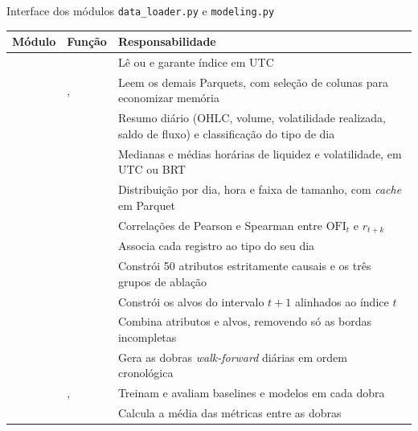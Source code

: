 \begin{quadro}[htbp]
\caption{\label{qua:modulos2}Interface dos módulos \texttt{data\_loader.py} e \texttt{modeling.py}}
\begin{corpotabela}
\begin{tabularx}{\textwidth}{|L{1.9cm}|L{4.6cm}|Y|}
\hline
\textbf{Módulo} & \textbf{Função} & \textbf{Responsabilidade} \\ \hline
{}
 &  & Lê  ou  e garante índice em UTC \\ 
 & ,  & Leem os demais Parquets, com seleção de colunas para economizar memória \\ 
 &  & Resumo diário (OHLC, volume, volatilidade realizada, saldo de fluxo) e classificação do tipo de dia \\ 
 &  & Medianas e médias horárias de liquidez e volatilidade, em UTC ou BRT \\ 
 &  & Distribuição por dia, hora e faixa de tamanho, com \textit{cache} em Parquet \\ 
 &  & Correlações de Pearson e Spearman entre $\mathrm{OFI}_t$ e $r_{t+k}$ \\ 
 &  & Associa cada registro ao tipo do seu dia \\ \hline
{}
 &  & Constrói 50 atributos estritamente causais e os três grupos de ablação \\ 
 &  & Constrói os alvos do intervalo $t+1$ alinhados ao índice $t$ \\ 
 &  & Combina atributos e alvos, removendo só as bordas incompletas \\ 
 &  & Gera as dobras \textit{walk-forward} diárias em ordem cronológica \\ 
 & ,  & Treinam e avaliam baselines e modelos em cada dobra \\ 
 &  & Calcula a média das métricas entre as dobras \\ \hline
\end{tabularx}
\end{corpotabela}
\fonteautores[Elaborado]
\end{quadro}

